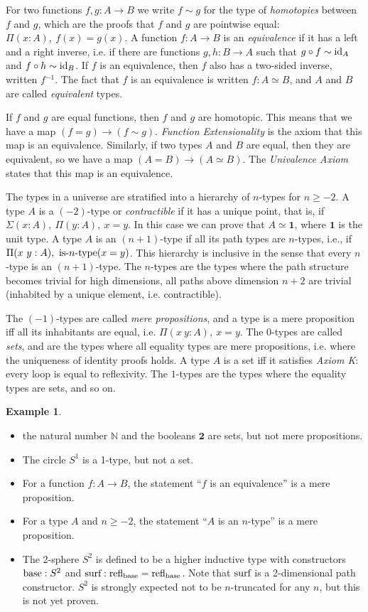 \documentclass[square]{sigplanconf}
\newcommand{\fa}[2]{\ensuremath{\Pi(#1),\ #2}}
\newcommand{\ex}[2]{\ensuremath{\Sigma(#1),\ #2}}
\newcommand{\unit}{\ensuremath{\mathbf{1}}}
\newcommand{\bool}{\ensuremath{\mathbf{2}}}
\newcommand{\id}{\textnormal{id}}
\newcommand{\istrunc}[1]{\textnormal{is-}#1\textnormal{-type}}
\newcommand{\refl}{\textnormal{refl}}
\newcommand{\base}{\textnormal{base}}
\newcommand{\surf}{\textnormal{surf}}
\newcommand{\N}{\mathbb{N}}
\newcommand{\sy}{\ensuremath{^{-1}}}
\theoremstyle{definition}
\newtheorem{example}[theorem]{Example}
\theoremstyle{remark}
\begin{document}
For two functions $f,g : A \to B$ we write $f\sim g$ for the type of \emph{homotopies} between $f$
and $g$, which are the proofs that $f$ and $g$ are pointwise equal: $\fa{x : A}{f(x) = g(x)}$. A
function $f : A \to B$ is an \emph{equivalence} if it has a left and a right inverse, i.e. if there
are functions $g, h : B \to A$ such that $g \circ f\sim \id_A$ and $f\circ h\sim \id_B$. If $f$ is
an equivalence, then $f$ also has a two-sided inverse, written $f\sy$. The fact that $f$ is an
equivalence is written $f : A \simeq B$, and $A$ and $B$ are called \emph{equivalent} types.

If $f$ and $g$ are equal functions, then $f$ and $g$ are homotopic. This means that we have a map
$(f = g) \to (f \sim g)$. \emph{Function Extensionality} is the axiom that this map is an
equivalence. Similarly, if two types $A$ and $B$ are equal, then they are equivalent, so we have a
map $(A = B) \to (A \simeq B)$. The \emph{Univalence Axiom} states that this map is an equivalence.

The types in a universe are stratified into a hierarchy of $n$-types for $n\geq-2$. A type $A$ is a
$(-2)$-type or \emph{contractible} if it has a unique point, that is, if $\ex{x : A}{\fa{y : A}{x =
    y}}$. In this case we can prove that $A\simeq\unit$, where $\unit$ is the unit type. A type $A$
is an $(n+1)$-type if all its path types are $n$-types, i.e., if $\fa{x\ y : A}{\istrunc{n}(x =
y)}$. This hierarchy is inclusive in the sense that every $n$-type is an $(n+1)$-type. The $n$-types
are the types where the path structure becomes trivial for high dimensions, all paths above
dimension $n+2$ are trivial (inhabited by a unique element, i.e. contractible).

The $(-1)$-types are called \emph{mere propositions}, and a type is a mere proposition iff all its
inhabitants are equal, i.e. $\fa{x\ y : A}{x = y}$. The $0$-types are called \emph{sets}, and are
the types where all equality types are mere propositions, i.e. where the uniqueness of identity
proofs holds. A type $A$ is a set iff it satisfies \emph{Axiom K}: every loop is equal to
reflexivity. The $1$-types are the types where the equality types are sets, and so on.

\begin{example}\mbox{}
\begin{itemize}
\item the natural number $\N$ and the booleans $\bool$ are sets, but not mere propositions.
\item The circle $S^1$ is a 1-type, but not a set.
\item For a function $f : A \to B$, the statement ``$f$ is an equivalence'' is a mere proposition.
\item For a type $A$ and $n\geq-2$, the statement ``$A$ is an $n$-type'' is a mere proposition.
\item The 2-sphere $S^2$ is defined to be a higher inductive type with constructors $\base : S^2$
  and $\surf : \refl_\base = \refl_\base$. Note that $\surf$ is a 2-dimensional path
  constructor. $S^2$ is strongly expected not to be $n$-truncated for any $n$, but this is not yet
  proven.
\end{itemize}
\end{example}
\end{document}
